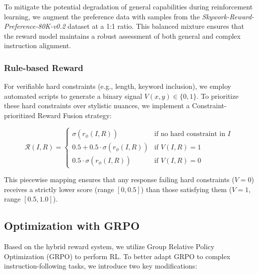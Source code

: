 To mitigate the potential degradation of general capabilities during reinforcement learning, we augment the preference data with samples from the \textit{Skywork-Reward-Preference-80K-v0.2} dataset \citep{liu2025skywork} at a 1:1 ratio. This balanced mixture ensures that the reward model maintains a robust assessment of both general and complex instruction alignment.

\subsubsection{Rule-based Reward}
For verifiable hard constraints (e.g., length, keyword inclusion), we employ automated scripts to generate a binary signal $V(x, y) \in \{0, 1\}$. To prioritize these hard constraints over stylistic nuances, we implement a Constraint-prioritized Reward Fusion strategy:

\begin{equation}
\mathcal{R}(I, R) =
\begin{cases}
\sigma(r_\phi(I, R)) & \text{if no hard constraint in }I \\
0.5 + 0.5 \cdot \sigma(r_\phi(I, R)) & \text{if } V(I, R) = 1 \\
0.5 \cdot \sigma(r_\phi(I, R)) & \text{if } V(I, R) = 0
\end{cases}
\end{equation}

This piecewise mapping ensures that any response failing hard constraints ($V=0$) receives a strictly lower score (range $[0, 0.5]$) than those satisfying them ($V=1$, range $[0.5, 1.0]$).

\subsection{Optimization with GRPO}

Based on the hybrid reward system, we utilize Group Relative Policy Optimization (GRPO) \citep{shao2024deepseekmath} to perform RL. To better adapt GRPO to complex instruction-following tasks, we introduce two key modifications:

